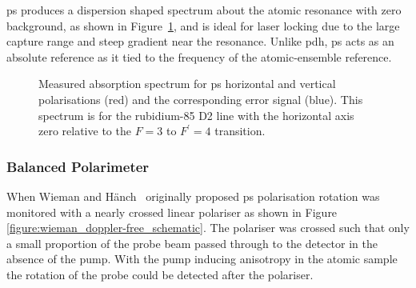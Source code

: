 
\Gls{ps} produces a dispersion shaped spectrum about the atomic resonance with zero background, as shown in Figure~\ref{figure:polspecspectrum}, and is ideal for laser locking due to the large capture range and steep gradient near the resonance.
Unlike \gls{pdh}, \gls{ps} acts as an absolute reference as it tied to the frequency of the atomic-ensemble reference.

\begin{figure}
\center

\caption[Polarisation spectroscopy absorption and error spectra.]{Measured absorption spectrum for \gls{ps} horizontal and vertical polarisations (red) and the corresponding error signal (blue). This spectrum is for the rubidium-85 D2 line with the horizontal axis zero relative to the $F=3$ to $F^\prime=4$ transition.}
\label{figure:polspecspectrum}
\end{figure}

\subsubsection{Balanced Polarimeter}

When Wieman and H\"anch~\cite{wieman_doppler-free_1976} originally proposed \gls{ps} polarisation rotation was monitored with a nearly crossed linear polariser as shown in Figure \ref{figure:wieman_doppler-free_schematic}.
The polariser was crossed such that only a small proportion of the probe beam passed through to the detector in the absence of the pump.
With the pump inducing anisotropy in the atomic sample the rotation of the probe could be detected after the polariser.

